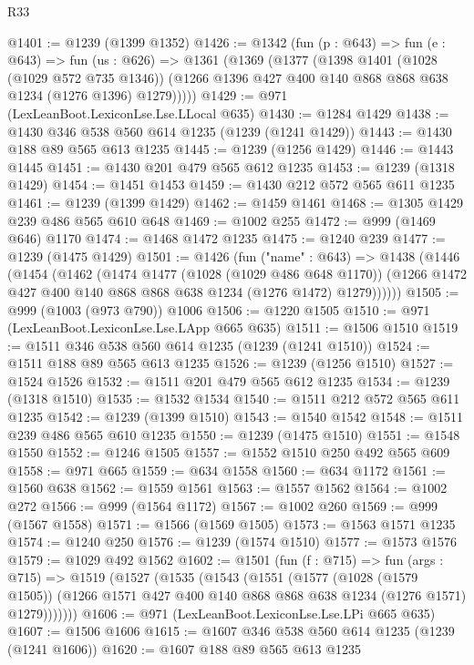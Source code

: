 \begin{lexlean}{R33}
\begin{coremodule}
@1401 := @1239 (@1399 @1352)
@1426 := @1342
    (fun (p : @643) =>
    fun (e : @643) =>
    fun (us : @626) =>
    @1361
      (@1369
        (@1377
          (@1398
            @1401
            (@1028 (@1029 @572 @735 @1346))
            (@1266 @1396 @427 @400 @140 @868 @868 @638 @1234 (@1276 @1396) @1279)))))
@1429 := @971 (LexLeanBoot.LexiconLse.Lse.LLocal @635)
@1430 := @1284 @1429
@1438 := @1430 @346 @538 @560 @614 @1235 (@1239 (@1241 @1429))
@1443 := @1430 @188 @89 @565 @613 @1235
@1445 := @1239 (@1256 @1429)
@1446 := @1443 @1445
@1451 := @1430 @201 @479 @565 @612 @1235
@1453 := @1239 (@1318 @1429)
@1454 := @1451 @1453
@1459 := @1430 @212 @572 @565 @611 @1235
@1461 := @1239 (@1399 @1429)
@1462 := @1459 @1461
@1468 := @1305 @1429 @239 @486 @565 @610 @648
@1469 := @1002 @255
@1472 := @999 (@1469 @646) @1170
@1474 := @1468 @1472 @1235
@1475 := @1240 @239
@1477 := @1239 (@1475 @1429)
@1501 := @1426
    (fun ("name" : @643) =>
    @1438
      (@1446
        (@1454
          (@1462
            (@1474
              @1477
              (@1028 (@1029 @486 @648 @1170))
              (@1266 @1472 @427 @400 @140 @868 @868 @638 @1234 (@1276 @1472) @1279))))))
@1505 := @999 (@1003 (@973 @790)) @1006
@1506 := @1220 @1505
@1510 := @971 (LexLeanBoot.LexiconLse.Lse.LApp @665 @635)
@1511 := @1506 @1510
@1519 := @1511 @346 @538 @560 @614 @1235 (@1239 (@1241 @1510))
@1524 := @1511 @188 @89 @565 @613 @1235
@1526 := @1239 (@1256 @1510)
@1527 := @1524 @1526
@1532 := @1511 @201 @479 @565 @612 @1235
@1534 := @1239 (@1318 @1510)
@1535 := @1532 @1534
@1540 := @1511 @212 @572 @565 @611 @1235
@1542 := @1239 (@1399 @1510)
@1543 := @1540 @1542
@1548 := @1511 @239 @486 @565 @610 @1235
@1550 := @1239 (@1475 @1510)
@1551 := @1548 @1550
@1552 := @1246 @1505
@1557 := @1552 @1510 @250 @492 @565 @609
@1558 := @971 @665
@1559 := @634 @1558
@1560 := @634 @1172
@1561 := @1560 @638
@1562 := @1559 @1561
@1563 := @1557 @1562
@1564 := @1002 @272
@1566 := @999 (@1564 @1172)
@1567 := @1002 @260
@1569 := @999 (@1567 @1558)
@1571 := @1566 (@1569 @1505)
@1573 := @1563 @1571 @1235
@1574 := @1240 @250
@1576 := @1239 (@1574 @1510)
@1577 := @1573 @1576
@1579 := @1029 @492 @1562
@1602 := @1501
    (fun (f : @715) =>
    fun (args : @715) =>
    @1519
      (@1527
        (@1535
          (@1543
            (@1551
              (@1577
                (@1028 (@1579 @1505))
                (@1266 @1571 @427 @400 @140 @868 @868 @638 @1234 (@1276 @1571) @1279)))))))
@1606 := @971 (LexLeanBoot.LexiconLse.Lse.LPi @665 @635)
@1607 := @1506 @1606
@1615 := @1607 @346 @538 @560 @614 @1235 (@1239 (@1241 @1606))
@1620 := @1607 @188 @89 @565 @613 @1235

\end{coremodule}
\end{lexlean}
